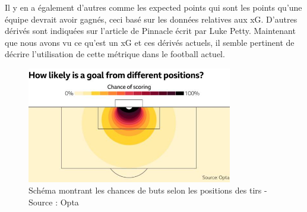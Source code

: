 \documentclass[12pt]{article}
\begin{document}
Il y en a également d'autres comme les expected points qui sont les points qu'une équipe devrait avoir gagnés, ceci basé sur les données relatives aux xG. D'autres dérivés sont indiquées sur l'article de Pinnacle écrit par Luke Petty. \cite{pettyWhatExpectedGoals2018a}
\newline\newline
Maintenant que nous avons vu ce qu'est un xG et ces dérivés actuels, il semble pertinent de décrire l'utilisation de cette métrique dans le football actuel.

\begin{figure}[htp]
    \centering
    \includegraphics[width=0.8\textwidth]{img/SchemaXG.jpeg}

    \caption{Schéma montrant les chances de buts selon les positions des tirs - Source : Opta}
    \label{fig:shotmap}
\end{figure}
\end{document}
